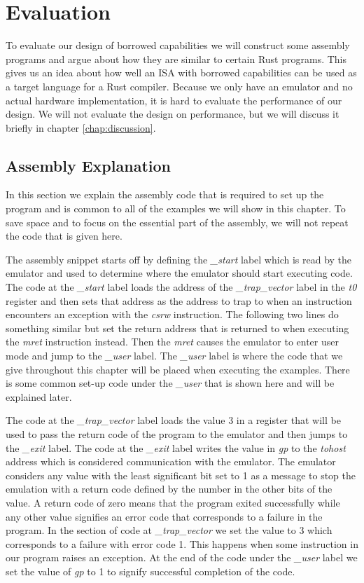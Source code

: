 \chapter{Evaluation}
\label{chap:evaluation}
To evaluate our design of borrowed capabilities we will construct some assembly programs and argue about how they are similar to certain Rust programs.
This gives us an idea about how well an ISA with borrowed capabilities can be used as a target language for a Rust compiler.
Because we only have an emulator and no actual hardware implementation, it is hard to evaluate the performance of our design.
We will not evaluate the design on performance, but we will discuss it briefly in chapter \ref{chap:discussion}.

\section{Assembly Explanation}
In this section we explain the assembly code that is required to set up the program and is common to all of the examples we will show in this chapter.
To save space and to focus on the essential part of the assembly, we will not repeat the code that is given here.

The assembly snippet starts off by defining the \textit{\_start} label which is read by the emulator and used to determine where the emulator should start executing code.
The code at the \textit{\_start} label loads the address of the \textit{\_trap\_vector} label in the \textit{t0} register and then sets that address as the address to trap to when an instruction encounters an exception with the \textit{csrw} instruction.
The following two lines do something similar but set the return address that is returned to when executing the \textit{mret} instruction instead.
Then the \textit{mret} causes the emulator to enter user mode and jump to the \textit{\_user} label.
The \textit{\_user} label is where the code that we give throughout this chapter will be placed when executing the examples.
There is some common set-up code under the \textit{\_user} that is shown here and will be explained later.

The code at the \textit{\_trap\_vector} label loads the value 3 in a register that will be used to pass the return code of the program to the emulator and then jumps to the \textit{\_exit} label.
The code at the \textit{\_exit} label writes the value in \textit{gp} to the \textit{tohost} address which is considered communication with the emulator.
The emulator considers any value with the least significant bit set to 1 as a message to stop the emulation with a return code defined by the number in the other bits of the value.
A return code of zero means that the program exited successfully while any other value signifies an error code that corresponds to a failure in the program.
In the section of code at \textit{\_trap\_vector} we set the value to 3 which corresponds to a failure with error code 1.
This happens when some instruction in our program raises an exception.
At the end of the code under the \textit{\_user} label we set the value of \textit{gp} to 1 to signify successful completion of the code.

